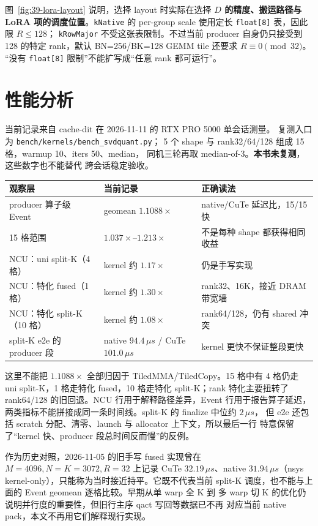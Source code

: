 图~\ref{fig:39-lora-layout} 说明，选择 layout 时实际在选择
\textbf{$D$ 的精度、搬运路径与 LoRA 项的调度位置}。\texttt{kNative} 的
per-group scale 使用定长 \texttt{float[8]} 表，因此限 $R\le128$；
\texttt{kRowMajor} 不受这张表限制。不过当前 producer 自身仍只接受到 128
的特定 rank，默认 BN=256/BK=128 GEMM tile 还要求 $R\equiv0\pmod{32}$。
“没有 \texttt{float[8]} 限制”不能扩写成“任意 rank 都可运行”。

\section{性能分析}

当前记录来自 cache-dit 在 2026-11-11 的 RTX PRO 5000 单会话测量。
复测入口为 \texttt{bench/kernels/}\allowbreak\texttt{bench\_svdquant.py}；
5 个 shape 与 rank32/64/128 组成 15 格，warmup 10、iters 50、median，
同机三轮再取 median-of-3。\textbf{本书未复测}，这些数字也不能替代
跨会话稳定验收。

\begin{center}\small
\begin{tabular}{@{}lll@{}}
\toprule
观察层 & 当前记录 & 正确读法 \\
\midrule
producer 算子级 Event & geomean $1.1088\times$ & native/CuTe 延迟比，15/15 快 \\
15 格范围 & $1.037\times$--$1.213\times$ & 不是每种 shape 都获得相同收益 \\
NCU：uni split-K（4 格） & kernel 约 $1.17\times$ & 仍是手写实现 \\
NCU：特化 fused（1 格） & kernel 约 $1.30\times$ & rank32、16K，接近 DRAM 带宽墙 \\
NCU：特化 split-K（10 格） & kernel 约 $1.08\times$ & rank64/128，仍有 shared 冲突 \\
split-K e2e 的 producer 段 & native $94.4\,\mu s$ / CuTe $101.0\,\mu s$ & kernel 更快不保证整段更快 \\
\bottomrule
\end{tabular}
\end{center}

这里不能把 $1.1088\times$ 全部归因于 TiledMMA/TiledCopy。15 格中有 4 格仍走
uni split-K，1 格走特化 fused，10 格走特化 split-K；rank 特化主要扭转了
rank64/128 的旧回退。NCU 行用于解释路径差异，Event 行用于报告算子延迟，
两类指标不能拼接成同一条时间线。split-K 的 finalize 中位约 $2\,\mu s$，
但 e2e 还包括 scratch 分配、清零、launch 与 allocator 上下文，所以最后一行
特意保留了“kernel 快、producer 段总时间反而慢”的反例。

作为历史对照，2026-11-05 的旧手写 fused 实现曾在
$M=4096,N=K=3072,R=32$ 上记录 CuTe $32.19\,\mu s$、native
$31.94\,\mu s$（nsys kernel-only），只能称为当时接近持平。它既不代表当前
split-K 调度，也不能与上面的 Event geomean 逐格比较。早期从单 warp 全 K 到
多 warp 切 K 的优化仍说明并行度的重要性，但旧行主序 qact 写回等数据已不再
对应当前 native pack，本文不再用它们解释现行实现。

